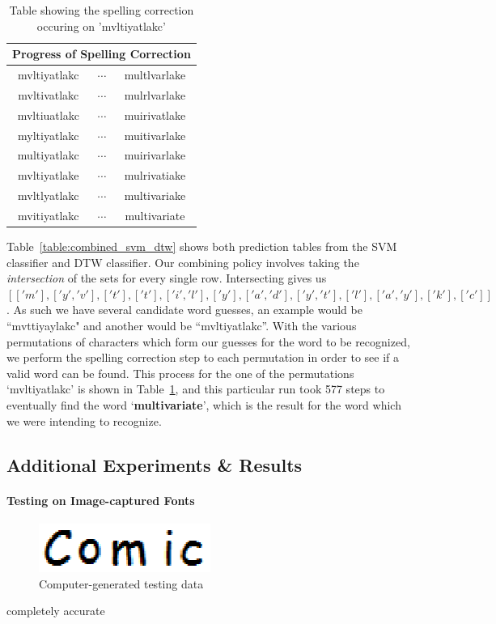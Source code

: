 \documentclass[12pt]{article}
\begin{document}
	\begin{table}[htp!]
\begin{center}	
\begin{tabular}[c]{|c|c|c|}
  \hline
  \multicolumn{3}{|c|}{Progress of Spelling Correction}  \\
  \hline
  mvltiyatlakc & $\cdots$ & multlvarlake \\
  mvltivatlakc & $\cdots$ & mulrlvarlake \\
  mvltiuatlakc & $\cdots$ & muirivatlake \\
  myltiyatlakc & $\cdots$ & muitivarlake \\
  multiyatlakc & $\cdots$ & muirivarlake \\
  mvltiyatlake & $\cdots$ & mulrivatiake \\
  mvltlyatlakc & $\cdots$ & multivariake \\
  mvitiyatlakc & $\cdots$ & multivariate \\ 
  \hline
\end{tabular}
\caption{Table showing the spelling correction occuring on 'mvltiyatlakc'}
 \label{table:spellcheck}
\end{center}
\end{table}

	Table~\ref{table:combined_svm_dtw} shows both prediction tables from the SVM classifier and DTW classifier. Our combining policy involves taking the \textit{intersection} of the sets for every single row. Intersecting gives us $[['m'], ['y', 'v'], ['t'], ['t'], ['i', 'l'], ['y'], ['a', 'd'], ['y', 't'], ['l'], ['a', 'y'], ['k'], ['c']]$. As such we have several candidate word guesses, an example would be ``mvttiyaylakc" and another would be ``mvltiyatlakc''. With the various permutations of characters which form our guesses for the word to be recognized, we perform the spelling correction step to each permutation in order to see if a valid word can be found. This process for the one of the permutations `mvltiyatlakc' is shown in Table~\ref{table:spellcheck}, and this particular run took 577 steps to eventually find the word `\textbf{multivariate}', which is the result for the word which we were intending to recognize. 

	



	
	\subsection{Additional Experiments \& Results}
	\label{subsection:results:additional}
	\paragraph{Testing on Image-captured Fonts}\begin{figure}[htbp!]
	\centering
	\includegraphics[width=0.5\textwidth]{comic_comp.eps}
	\caption{Computer-generated testing data}
	\label{figure:comic_comp}
	\end{figure}
	completely accurate
	
\end{document}
